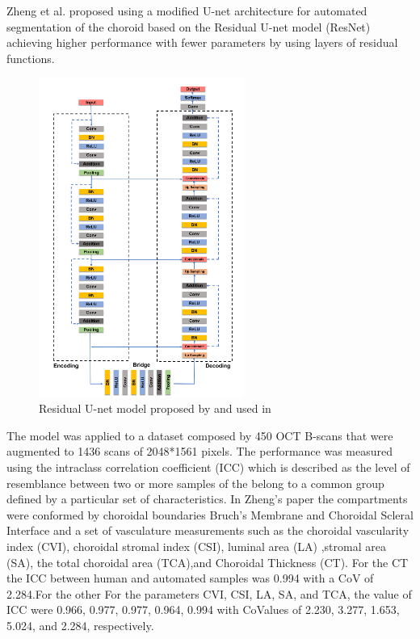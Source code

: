 \documentclass[12pt,a4paper]{scrartcl}
\begin{document}
Zheng et al. \cite{Zheng2020} proposed using a modified U-net architecture for automated segmentation of the choroid based on the Residual U-net model (ResNet) \cite{He2015} achieving higher performance with fewer parameters by using layers of residual functions. 
\begin{figure}[H]
    \centering
    \includegraphics[width=0.6\textwidth]{./images/ResNet-architecture.png}
    \caption{Residual U-net model proposed by \cite{He2015} and used in \cite{Zheng2020}}
\end{figure}

The model was applied to a dataset composed by 450 OCT B-scans that were augmented to 1436 scans of 2048*1561 pixels. The performance was measured using the intraclass correlation coefficient (ICC) which is described as the level of resemblance between two or more samples of the belong to a common group defined by a particular set of characteristics. In Zheng's paper the compartments were conformed by choroidal boundaries Bruch's Membrane and Choroidal Scleral Interface and a set of vasculature measurements such as the choroidal vascularity index (CVI), choroidal stromal index (CSI), luminal area (LA) ,stromal area (SA), the total choroidal area (TCA),and Choroidal Thickness (CT). For the CT the ICC between human and automated samples was 0.994 with a CoV of 2.284.For the other For the parameters CVI, CSI, LA, SA, and TCA, the value of ICC were 0.966, 0.977, 0.977, 0.964, 0.994 with CoValues of 2.230, 3.277, 1.653, 5.024, and 2.284, respectively.
\end{document}
